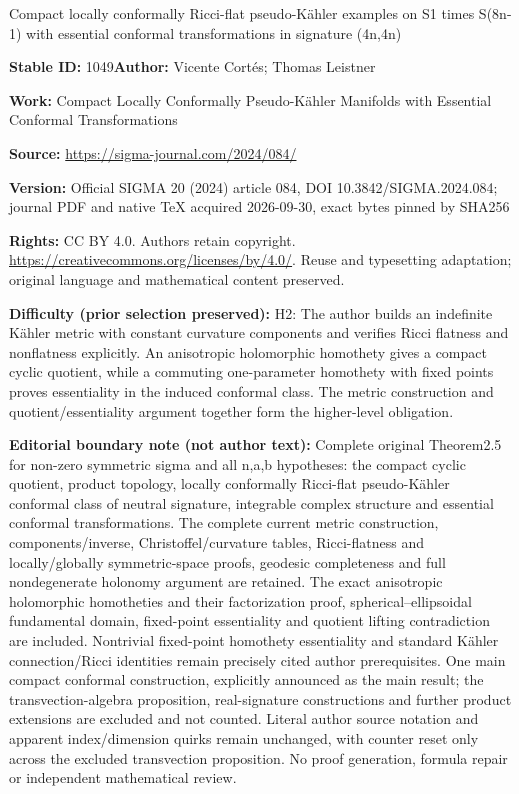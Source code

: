 \documentclass[11pt]{article}
\numberwithin{equation}{section}
\numberwithin{equation}{section}
\newcommand{\1}{\mathbf{1}}
\newcommand{\+}{\oplus}
\renewcommand{\=}{\equiv}
\begin{document}
\begin{center}\Large Compact locally conformally Ricci-flat pseudo-Kähler examples on S1 times S(8n-1) with essential conformal transformations in signature (4n,4n)\end{center}
\noindent\textbf{Stable ID:} 1049\quad\textbf{Author:} Vicente Cortés; Thomas Leistner\par
\noindent\textbf{Work:} Compact Locally Conformally Pseudo-Kähler Manifolds with Essential Conformal Transformations\par
\noindent\textbf{Source:} \url{https://sigma-journal.com/2024/084/}\par
\noindent\textbf{Version:} Official SIGMA 20 (2024) article 084, DOI 10.3842/SIGMA.2024.084; journal PDF and native TeX acquired 2026-09-30, exact bytes pinned by SHA256\par
\noindent\textbf{Rights:} CC BY 4.0. Authors retain copyright. \url{https://creativecommons.org/licenses/by/4.0/}. Reuse and typesetting adaptation; original language and mathematical content preserved.\par
\noindent\textbf{Difficulty (prior selection preserved):} {\CJKfont H2: The author builds an indefinite Kähler metric with constant curvature components and verifies Ricci flatness and nonflatness explicitly. An anisotropic holomorphic homothety gives a compact cyclic quotient, while a commuting one-parameter homothety with fixed points proves essentiality in the induced conformal class. The metric construction and quotient/essentiality argument together form the higher-level obligation.}\par
\medskip\noindent\textbf{Editorial boundary note (not author text):} Complete original Theorem2.5 for non-zero symmetric sigma and all n,a,b hypotheses: the compact cyclic quotient, product topology, locally conformally Ricci-flat pseudo-Kähler conformal class of neutral signature, integrable complex structure and essential conformal transformations. The complete current metric construction, components/inverse, Christoffel/curvature tables, Ricci-flatness and locally/globally symmetric-space proofs, geodesic completeness and full nondegenerate holonomy argument are retained. The exact anisotropic holomorphic homotheties and their factorization proof, spherical–ellipsoidal fundamental domain, fixed-point essentiality and quotient lifting contradiction are included. Nontrivial fixed-point homothety essentiality and standard Kähler connection/Ricci identities remain precisely cited author prerequisites. One main compact conformal construction, explicitly announced as the main result; the transvection-algebra proposition, real-signature constructions and further product extensions are excluded and not counted. Literal author source notation and apparent index/dimension quirks remain unchanged, with counter reset only across the excluded transvection proposition. No proof generation, formula repair or independent mathematical review.\par
\end{document}

